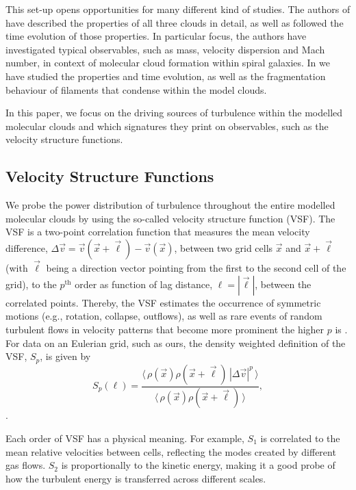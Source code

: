 This set-up opens opportunities for many different kind of studies. 
The authors of  have described the properties of all three clouds in detail, as well as followed the time evolution of those properties. 
In particular focus, the authors have investigated typical observables, such as mass, velocity dispersion and Mach number, in context of molecular cloud formation within spiral galaxies.
In  we have studied the properties and time evolution, as well as the fragmentation behaviour of filaments that condense within the model clouds. 

In this paper, we focus on the driving sources of turbulence  within the modelled molecular clouds and which signatures they print on observables, such as the velocity structure functions.


\subsection{Velocity Structure Functions}\label{methods:vsf}

We probe the power distribution of turbulence throughout the entire modelled molecular clouds by using the so-called velocity structure function (VSF).
The VSF is a two-point correlation function that measures the mean velocity difference, $\Delta \vec{v} = \vec{v}(\vec{x}+\vec{\ell}) - \vec{v}(\vec{x})$, between two grid cells $\vec{x}$ and $\vec{x}+\vec{\ell}$ (with $\vec{\ell}$ being a direction vector pointing from the first to the second cell of the grid), to the $p^\mathrm{th}$ order as function of lag distance, $\ell = |\vec{\ell}|$, between the correlated points.
Thereby, the VSF estimates the occurrence of symmetric motions (e.g., rotation, collapse, outflows), as well as rare events of random turbulent flows in velocity patterns that become more prominent the higher $p$ is \citep{Heyer2004}.
For data on an Eulerian grid, such as ours, the density weighted definition of the VSF, $\mathit{S}_p$, is given by
\begin{equation}
	\mathit{S}_p (\ell) = \frac{\langle \, \rho(\vec{x}) \rho(\vec{x}+\vec{\ell}) \, |\Delta \vec{v}|^p  \, \rangle}{\langle  \, \rho(\vec{x}) \rho(\vec{x}+\vec{\ell}) \, \rangle} ,
    \label{equ:method:def_vsf}
\end{equation}
\citep[and references within]{Padoan2016a}.

Each order of VSF has a physical meaning. 
For example, $\mathit{S}_1$ is correlated to the mean relative velocities between cells, reflecting the modes created by different gas flows.
$\mathit{S}_2$ is proportionally to the kinetic energy, making it a good probe of how the turbulent energy is transferred across different scales.

